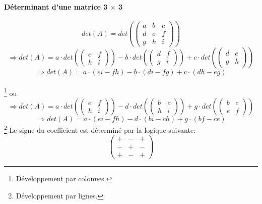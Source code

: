 \documentclass[10pt,a4paper]{book}
\newcommand{\x}{$\times$ }
\begin{document}
\paragraph{Déterminant d'une matrice 3 \x 3}
\[det(A)= det\left( 
\begin{pmatrix}
 a & b & c \\
 d & e & f \\
 g & h & i
\end{pmatrix}\right)\]
\[\Rightarrow det(A) = a\cdot det\left(\begin{pmatrix}
e & f \\
h & i
\end{pmatrix}\right)
-b\cdot det\left(\begin{pmatrix}
d & f \\
g & i
\end{pmatrix}\right)
+c\cdot det\left(\begin{pmatrix}
d & e \\
g & h
\end{pmatrix}\right)\]
\[\Rightarrow det(A) = a\cdot (ei-fh) - b \cdot (di - fg) + c \cdot (dh -eg)\]\\
\footnote{Développement par colonnes.}
ou
\[\Rightarrow det(A) = a\cdot det\left(\begin{pmatrix}
e & f \\
h & i
\end{pmatrix}\right)
-d\cdot det\left(\begin{pmatrix}
b & c \\
h & i
\end{pmatrix}\right)
+g\cdot det\left(\begin{pmatrix}
b & c \\
e & f
\end{pmatrix}\right)\]
\[\Rightarrow det(A) = a\cdot (ei-fh) - d \cdot (bi - ch) + g \cdot (bf - ce)\]\footnote{Développement par lignes.}
Le signe du coefficient est déterminé par la logique suivante:
\[\begin{pmatrix}
+ & - & + \\
- & + & - \\
+ & - & +
\end{pmatrix}\]
\end{document}
